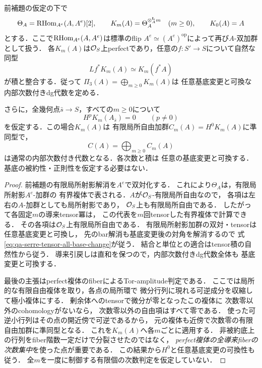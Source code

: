 \begin{proposition}
\label{prop:qa-relative-serre-tensor-base-change}
前補題の仮定の下で
\[
\Theta_A=\operatorname{RHom}_{A^e}(A,A^e)[2],\qquad
K_m(A)=\Theta_A^{\otimes_A^{\mathbf L}m}\quad(m\ge0),
\qquad K_0(A)=A
\]
とする．ここで$\operatorname{RHom}_{A^e}(A,A^e)$は標準のflip
$A^e\simeq(A^e)^{\mathrm{op}}$によって再び$A$-双加群として扱う．
各$K_m(A)$は$\mathcal O_S$上perfectであり，任意の$f:S'\to S$について自然な同型
\begin{equation}
Lf^*K_m(A)\simeq K_m(f^*A)
\label{eq:qa-serre-tensor-all-base-change}
\end{equation}
が積と整合する．従って
$\Pi_3(A)=\bigoplus_{m\ge0}K_m(A)$は
任意基底変更と可換な内部次数付きdg代数を定める．

さらに，全幾何点$\bar s\to S$，すべての$m\ge0$について
\begin{equation}
H^pK_m(A_{\bar s})=0\qquad(p\ne0)
\tag{Fwd}\label{eq:qa-relative-geometric-forward}
\end{equation}
を仮定する．この場合$K_m(A)$は
有限局所自由加群$C_m(A)=H^0K_m(A)$に準同型で，
\[
C(A)=\bigoplus_{m\ge0}C_m(A)
\]
は通常の内部次数付き代数となる．各次数と積は
任意の基底変更と可換する．
基底の被約性・正則性を仮定する必要はない．
\end{proposition}
\begin{proof}
前補題の有限局所射影解消を$A^e$で双対化する．
これにより$\Theta_A$は，有限局所射影$A^e$-加群の
有界複体で表される．$A$が$\mathcal O_S$-有限局所自由なので，
各項は左右の$A$-加群としても局所射影であり，
$\mathcal O_S$上も有限局所自由である．
したがって各固定$m$の導来tensor冪は，
この代表を$m$回tensorした有界複体で計算できる．
その各項は$\mathcal O_S$上有限局所自由である．
有限局所射影加群の双対・tensorは任意基底変更と可換し，
先のbar解消も基底変更後の対角を解消するので
式\eqref{eq:qa-serre-tensor-all-base-change}が従う．
結合と単位との適合はtensor積の自然性から従う．
導来引戻しは直和を保つので，内部次数付きdg代数全体も
基底変更と可換する．

最後の主張はperfect複体のfiberによるTor-amplitude判定である．
ここでは局所的な有限自由複体を取り，各点の局所環で
微分行列に現れる可逆成分を収縮して極小複体にする．
剰余体へのtensorで微分が零となったこの複体に
次数零以外のcohomologyがないなら，
次数零以外の自由項はすべて零である．
使った可逆小行列はその点の開近傍で可逆であるから，
元の複体も近傍で次数零の有限自由加群に準同型となる．
これを$K_m(A)$へ各$m$ごとに適用する．
非被約底上の行列をfiber階数一定だけで分裂させたのではなく，
\emph{perfect複体の全導来fiberの次数集中}を使った点が重要である．
この結果から$H^0$と任意基底変更の可換性も従う．
全$m$を一度に制御する有限個の次数判定を仮定していない．
\end{proof}

